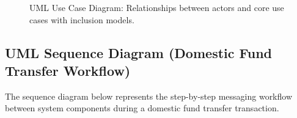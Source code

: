 \documentclass[11pt,a4paper]{article}
\begin{document}
\begin{figure}[H]
\caption{UML Use Case Diagram: Relationships between actors and core use cases with inclusion models.}
\label{fig:use_case}
\end{figure}


\newpage
\subsection{UML Sequence Diagram (Domestic Fund Transfer Workflow)}
The sequence diagram below represents the step-by-step messaging workflow between system components during a domestic fund transfer transaction.
\end{document}
